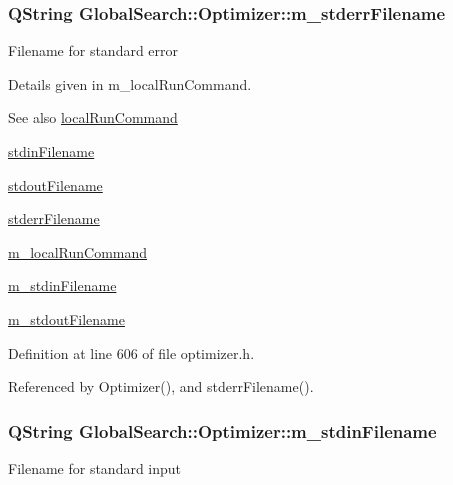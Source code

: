 \hypertarget{classGlobalSearch_1_1Optimizer_a75b800a7f90a03d551f6795404d0c8f1}{}
\subsubsection[{m\+\_\+stderr\+Filename}]{\setlength{\rightskip}{0pt plus 5cm}Q\+String Global\+Search\+::\+Optimizer\+::m\+\_\+stderr\+Filename\hspace{0.3cm}{\ttfamily [protected]}}\label{classGlobalSearch_1_1Optimizer_a75b800a7f90a03d551f6795404d0c8f1}
Filename for standard error

Details given in m\+\_\+local\+Run\+Command.

\begin{DoxySeeAlso}{See also}
\hyperlink{classGlobalSearch_1_1Optimizer_aed5eb285d45a001c9520c2ed3a5b57a1}{local\+Run\+Command} 

\hyperlink{classGlobalSearch_1_1Optimizer_a5964a9b38d3ae90c8ac36a75d3a35832}{stdin\+Filename} 

\hyperlink{classGlobalSearch_1_1Optimizer_a217750aa50431f9948aa8164fb99de0c}{stdout\+Filename} 

\hyperlink{classGlobalSearch_1_1Optimizer_acaa83cc6bf1dcc263b92450b4f8cb652}{stderr\+Filename} 

\hyperlink{classGlobalSearch_1_1Optimizer_a1cdb6b6c5e929e84c834ba93148fb31e}{m\+\_\+local\+Run\+Command} 

\hyperlink{classGlobalSearch_1_1Optimizer_aca91d12d7aecae052d6ab5ae158acec6}{m\+\_\+stdin\+Filename} 

\hyperlink{classGlobalSearch_1_1Optimizer_a5ed04fdd5f8b511249e408adcd174550}{m\+\_\+stdout\+Filename} 
\end{DoxySeeAlso}


Definition at line 606 of file optimizer.\+h.



Referenced by Optimizer(), and stderr\+Filename().

\hypertarget{classGlobalSearch_1_1Optimizer_aca91d12d7aecae052d6ab5ae158acec6}{}
\subsubsection[{m\+\_\+stdin\+Filename}]{\setlength{\rightskip}{0pt plus 5cm}Q\+String Global\+Search\+::\+Optimizer\+::m\+\_\+stdin\+Filename\hspace{0.3cm}{\ttfamily [protected]}}\label{classGlobalSearch_1_1Optimizer_aca91d12d7aecae052d6ab5ae158acec6}
Filename for standard input

